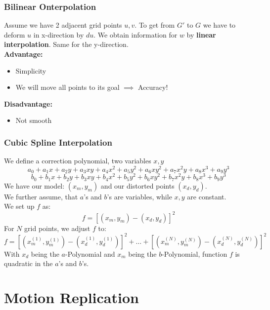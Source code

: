 \documentclass{exerciseBlue}
\begin{document}
\subsubsection{Bilinear Onterpolation}
Assume we have 2 adjacent grid points $u,v$. To get from $G'$ to $G$ we have to deform $u$ in x-direction by $du$. We obtain information for $w$ by \textbf{linear interpolation}. Same for the y-direction.\\
\textbf{Advantage:} \begin{itemize}
	\item Simplicity
	\item We will move all points to its goal $\implies$ Accuracy!
\end{itemize}
\textbf{Disadvantage:} \begin{itemize}
	\item Not smooth
\end{itemize}
\subsubsection{Cubic Spline Interpolation}
We define a correction polynomial, two variables $x,y$
$$a_0 + a_1x+a_2y+a_3xy+a_4x^2+a_5y^2+a_6xy^2+a_7x^2y+a_8x^3 + a_9y^3$$
$$b_0 + b_1x+b_2y+b_3xy+b_4x^2+b_5y^2+b_6xy^2+b_7x^2y+b_8x^3 + b_9y^3$$
We have our model: $(x_m,y_m)$ and our distorted points $(x_d,y_d)$.\\
We further assume, that $a$'s and $b$'s are variables, while $x,y$ are constant.\\
We set up $f$ as:
$$f = [(x_m,y_m)-(x_d,y_d)]^2$$
For $N$ grid points, we adjust $f$ to:
$$f = [(x_m^{(1)},y_m^{(1)})-(x_d^{(1)},y_d^{(1)})]^2 + \dots + [(x_m^{(N)},y_m^{(N)})-(x_d^{(N)},y_d^{(N)})]^2$$
With $x_d$ being the $a$-Polynomial and $x_m$ being the $b$-Polynomial, function $f$ is quadratic in the $a$'s and $b$'s.
  \section{Motion Replication}\label{sec:motion}
\end{document}

